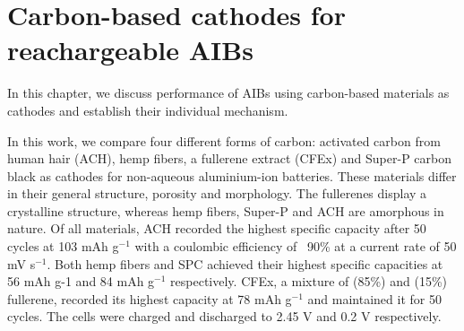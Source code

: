 \chapter{Carbon-based cathodes for reachargeable AIBs} %
In this chapter, we discuss performance of AIBs using carbon-based materials as cathodes and establish their individual mechanism.
\label{chap5} %


\newcommand{\keyword}[1]{\textbf{#1}}
\newcommand{\tabhead}[1]{\textbf{#1}}
\newcommand{\code}[1]{\texttt{#1}}
\newcommand{\file}[1]{\texttt{\bfseries#1}}
\newcommand{\option}[1]{\texttt{\itshape#1}}
 In this work, we compare four different forms of carbon: activated carbon from human hair (ACH), hemp fibers, a fullerene extract (CFEx) and Super-P carbon black as cathodes for non-aqueous aluminium-ion batteries. These materials differ in their general structure, porosity and morphology. The fullerenes display a crystalline structure, whereas hemp fibers, Super-P and ACH are amorphous in nature. Of all materials, ACH recorded the highest specific capacity after 50 cycles at 103 mAh g$^{-1}$ with a coulombic efficiency of ~90\% at a current rate of 50 mV s$^{-1}$. Both hemp fibers and SPC achieved their highest specific capacities at 56 mAh g-1 and 84 mAh g$^{-1}$ respectively. CFEx, a mixture of  (85\%) and  (15\%) fullerene, recorded its highest capacity at 78 mAh g$^{-1}$ and maintained it for 50 cycles. The cells were charged and discharged to 2.45 V and 0.2 V respectively. 
